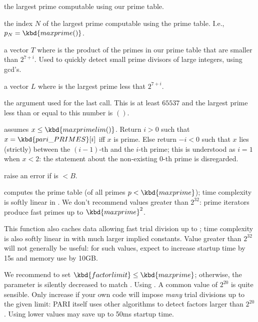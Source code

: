  the largest prime computable using our prime table.

 the index $N$ of the largest prime computable using
the prime table. I.e., $p_N = \kbd{maxprime()}$.

 a vector $T$ where  is the product of the
primes in our prime table that are smaller than $2^{7+i}$. Used to quickly
detect small prime divisors of large integers, using gcd's.

 a vector $L$ where  is the largest
prime less that $2^{7+i}$.

 the argument used for the last
call. This is at least $65537$ and the largest prime
less than or equal to this number is $()$.

 assumes $x \leq \kbd{maxprimelim()}$. Return
$i > 0$ such that $x = \kbd{pari\_PRIMES}[i]$ iff $x$ is prime. Else
return $-i < 0$ such that $x$ lies (strictly) between the $(i-1)$-th and
the $i$-th prime; this is understood as $i = 1$ when $x < 2$: the statement
about the non-existing $0$-th prime is disregarded.

 raise an error if  is $< B$.

 computes
the prime table  (of all primes $p < \kbd{maxprime}$);
time complexity is softly linear in . We don't recommend values
greater than $2^{32}$: prime iterators produce fast primes up to
$\kbd{maxprime}^2$.

This function also caches data allowing fast trial division up to
; time complexity is also softly linear in 
with much larger implied constants. Value greater than $2^{32}$ will not
generally be useful: for such values, expect to increase startup time by 15s
and memory use by 10GB.

We recommend to set $\kbd{factorlimit} \leq \kbd{maxprime}$; otherwise, the
parameter  is silently decreased to match .
Using . A common value of $2^{20}$ is quite sensible. Only
increase  if your own code will impose \emph{many} trial
divisions up to the given limit: PARI itself uses other algorithms to detect
factors larger than $2^{20}$. Using lower values may save up to 50ms startup
time.

